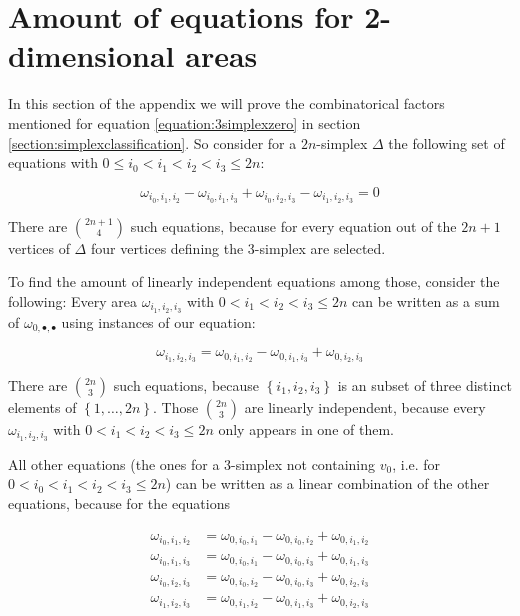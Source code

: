 \documentclass[../SymplecticSimplices.tex]{subfiles}
\begin{document}
\section{Amount of equations for 2-dimensional areas}
\label{appendix:equationamount}

In this section of the appendix we will prove the combinatorical factors mentioned for equation \eqref{equation:3simplexzero} in section \ref{section:simplexclassification}. So consider for a \( 2n \)-simplex \( \Delta \) the following set of equations with \( 0 \leq i_0 < i_1 < i_2 < i_3 \leq 2n \):

\begin{equation*}
  \omega_{i_0, i_1, i_2} - \omega_{i_0, i_1, i_3} + \omega_{i_0, i_2, i_3} - \omega_{i_1, i_2, i_3} = 0
\end{equation*}

There are \( \binom{2n+1}{4} \) such equations, because for every equation out of the \( 2n+1 \) vertices of \( \Delta \) four vertices defining the 3-simplex are selected.

To find the amount of linearly independent equations among those, consider the following: Every area \( \omega_{i_1, i_2, i_3} \) with \( 0 < i_1 < i_2 < i_3 \leq 2n \) can be written as a sum of \( \omega_{0, \bullet, \bullet} \) using instances of our equation:

\begin{equation*}
  \omega_{i_1, i_2, i_3} = \omega_{0, i_1, i_2} - \omega_{0, i_1, i_3} + \omega_{0, i_2, i_3}
\end{equation*}

There are \( \binom{2n}{3} \) such equations, because \( \left\lbrace i_1, i_2, i_3 \right\rbrace \) is an subset of three distinct elements of \( \left\lbrace 1, \dots, 2n \right\rbrace \). Those \( \binom{2n}{3} \) are linearly independent, because every \( \omega_{i_1, i_2, i_3} \) with \( 0 < i_1 < i_2 < i_3 \leq 2n \) only appears in one of them.

All other equations (the ones for a 3-simplex not containing \( v_0 \), i.e. for \( 0 < i_0 < i_1 < i_2 < i_3 \leq 2n \)) can be written as a linear combination of the other equations, because for the equations

\begin{align}
  \omega_{i_0, i_1, i_2} & = \omega_{0, i_0, i_1} - \omega_{0, i_0, i_2} + \omega_{0, i_1, i_2} \label{equation:equationamount:1}\\
  \omega_{i_0, i_1, i_3} & = \omega_{0, i_0, i_1} - \omega_{0, i_0, i_3} + \omega_{0, i_1, i_3} \label{equation:equationamount:2}\\
  \omega_{i_0, i_2, i_3} & = \omega_{0, i_0, i_2} - \omega_{0, i_0, i_3} + \omega_{0, i_2, i_3} \label{equation:equationamount:3}\\
  \omega_{i_1, i_2, i_3} & = \omega_{0, i_1, i_2} - \omega_{0, i_1, i_3} + \omega_{0, i_2, i_3} \label{equation:equationamount:4}
\end{align}
\end{document}
